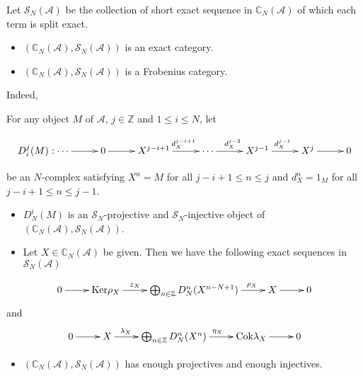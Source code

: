 \documentclass[t,ignorenonframetext]{beamer}
\newcommand{\CA}{\mathcal{A} }
\newcommand{\C}{\mathbb{C} }
\newcommand{\Z}{\mathbb{Z} }
\newcommand{\Cok}{{\rm{Cok}}}
\newcommand{\Ker}{{\rm{Ker}}}
\begin{document}
\begin{frame}
Let $\mathcal{S}_N(\CA)$ be the collection of short exact sequence in $\C_N(\CA)$ of which each term is split exact.
 
\vspace{0.4cm}
\pause
\begin{itemize}[<+->]
\item $(\C_N(\CA),\mathcal{S}_N(\CA))$ is an exact category.
\item  $(\C_N(\CA),\mathcal{S}_N(\CA))$ is a Frobenius category.
\end{itemize}

\pause
Indeed,

\pause
For any object $M$ of $\CA$, $j\in \Z$ and $1\leq i \leq N$, let
\begin{small}
$$\xymatrixcolsep{2.20pc}\xymatrix{  D^{j}_{i}(M): \cdots \ar[r] & 0 \ar[r] & X^{j-i+1} \ar[r]^{\,\,\,\,{d}^{j-i+1}_X} & \cdots \ar[r]^{{d}^{j-2}_X} & X^{j-1} \ar[r]^{{d}^{j-1}_X}  & X^j \ar[r] &0}$$
\end{small}
be an $N$-complex satisfying $X^n=M$ for all $j-i+1\leq n \leq j$ and $d^{n}_X=1_M$ for all $j-i+1\leq n \leq j-1$.
\end{frame}

\begin{frame}
\begin{itemize}[<+->]
\item $D_{N}^{i}(M)$ is an $\mathcal{S}_N$-projective and $\mathcal{S}_N$-injective object of $(\C_N(\CA),\mathcal{S}_N(\CA))$.
\item  Let $X\in \C_N(\CA)$ be given. Then we have the following exact sequences in $\mathcal{S}_N(\CA)$
\end{itemize}
\pause
\[
\xymatrix{0 \ar[r] & \Ker \rho_X \ar[r]^{\varepsilon_X \qquad\quad} & \bigoplus_{n\in \Z} D_{N}^{n}(X^{n-N+1}) \ar[r]^{\qquad \quad \,\,\,\,\,\, \rho_X} & X \ar[r]  & 0 }
\]
\pause 
and
\[
\xymatrix{0 \ar[r] & X \ar[r]^{\lambda_X \qquad\quad} & \bigoplus_{n\in \Z} D_{N}^{n}(X^{n}) \ar[r]^{\quad  \eta_X} & \Cok \lambda_X  \ar[r]  & 0 }
\]
\pause
\begin{itemize}[<+->]
\item  $(\C_N(\CA),\mathcal{S}_N(\CA))$ has enough projectives and enough injectives.
\end{itemize}
 
\end{frame}
\end{document}
